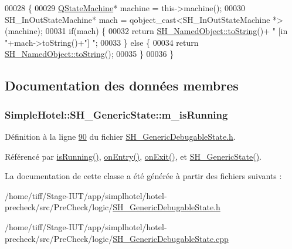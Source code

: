 \begin{DoxyCode}
00028 \{
00029     \hyperlink{classQStateMachine}{QStateMachine}* machine = this->machine();
00030     SH\_InOutStateMachine* mach = qobject\_cast<SH\_InOutStateMachine *>(machine);
00031     \textcolor{keywordflow}{if}(mach) \{
00032         \textcolor{keywordflow}{return} \hyperlink{classSimpleHotel_1_1SH__NamedObject_ab6e289aeff50c3fb0f30156c68b1e808}{SH\_NamedObject::toString}()+ \textcolor{stringliteral}{" [in "}+mach->toString()+\textcolor{stringliteral}{"] "};
00033     \} \textcolor{keywordflow}{else} \{
00034         \textcolor{keywordflow}{return} \hyperlink{classSimpleHotel_1_1SH__NamedObject_ab6e289aeff50c3fb0f30156c68b1e808}{SH\_NamedObject::toString}();
00035     \}
00036 \}
\end{DoxyCode}


\subsection{Documentation des données membres}
\hypertarget{classSimpleHotel_1_1SH__GenericState_a4e4ba53c9e163eed2685cfda8745308d}{
\subsubsection[{m\-\_\-is\-Running}]{\setlength{\rightskip}{0pt plus 5cm}Simple\-Hotel\-::\-S\-H\-\_\-\-Generic\-State\-::m\-\_\-is\-Running\hspace{0.3cm}{\ttfamily [private]}}}\label{classSimpleHotel_1_1SH__GenericState_a4e4ba53c9e163eed2685cfda8745308d}


Définition à la ligne \hyperlink{SH__GenericDebugableState_8h_source_l00090}{90} du fichier \hyperlink{SH__GenericDebugableState_8h_source}{S\-H\-\_\-\-Generic\-Debugable\-State.\-h}.



Référencé par \hyperlink{classSimpleHotel_1_1SH__GenericState_a5151ff071129bdd4dcf7c60cb93794da}{is\-Running()}, \hyperlink{classSimpleHotel_1_1SH__GenericState_adebdb330ff20556a54a833b15e50eacc}{on\-Entry()}, \hyperlink{classSimpleHotel_1_1SH__GenericState_acfcd0946dfa10d98c35abc8cd74b0429}{on\-Exit()}, et \hyperlink{classSimpleHotel_1_1SH__GenericState_a447410572f03a61d1d3170b55724a2de}{S\-H\-\_\-\-Generic\-State()}.



La documentation de cette classe a été générée à partir des fichiers suivants \-:\begin{DoxyCompactItemize}
\item 
/home/tiff/\-Stage-\/\-I\-U\-T/app/simplhotel/hotel-\/precheck/src/\-Pre\-Check/logic/\hyperlink{SH__GenericDebugableState_8h}{S\-H\-\_\-\-Generic\-Debugable\-State.\-h}\item 
/home/tiff/\-Stage-\/\-I\-U\-T/app/simplhotel/hotel-\/precheck/src/\-Pre\-Check/logic/\hyperlink{SH__GenericDebugableState_8cpp}{S\-H\-\_\-\-Generic\-Debugable\-State.\-cpp}\end{DoxyCompactItemize}
